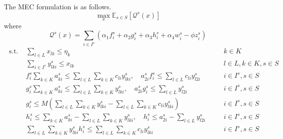 The MEC formulation is as follows.
\begin{equation}
    \max_{x} \mathbb{E}_{s\in S} [ \mathcal{Q}^s(x)]
    \label{eq1}
\end{equation}
where
\begin{equation}
    \mathcal{Q}^s(x) = %
    \sum_{i \in I^s}  (  \alpha_1 f_i^s + \alpha_2 g_i^s + \alpha_3 h_i^s + \alpha_4  w_i^s -\phi z_i^s ) \nonumber
\end{equation}
\begin{align}
\text{ s.t. } & \sum_{l \in L} x_{lk} \leq \eta_k   &\quad&  k \in K
    \label{eq3}\\
   & \sum_{i\in I^s}y_{lki}^s \leq x_{lk}  &&  l \in L,   k \in K,  s \in S 
    \label{eq4}\\
     &    f_i^s\sum_{k \in K}a_{ki}^s   \leq \sum_{l \in L} \sum_{k \in K} c_{li} y_{lki}^s, \quad   a_{2i}^s f_i^s \leq \sum_{l \in L}   c_{li} y_{l2i}^s &&  i \in I^s,   s \in S \label{eq6}\\
     &   g_i^s  \sum_{k \in K}  a_{ki}^s \leq \sum_{l \in L} \sum_{k \in K} y_{lki}^s, \quad   a_{2i}^s g_i^s \leq \sum_{l \in L}   y_{l2i}^s &&   i \in I^s, s \in S \label{eq7}\\
    & g_i^s \leq M \left( \sum_{l \in L} \sum_{k \in K } y_{lki}^s - \sum_{l \in L} \sum_{k \in K} c_{li} y_{lki}^s \right) &&  i \in I^s,   s\in S   \label{eq8}\\
  &  h_i^s \leq   \sum_{k \in K}  a_{ki}^s - \sum_{l \in L} \sum_{k \in K} y_{lki}^s, \quad  h_i^s \leq   a_{2i}^s - \sum_{l \in L}   y_{l2i}^s  && i \in I^s,    s\in S
    \label{eq9}\\
 & \sum_{l \in L} \sum_{k \in K} y_{lki}^s h_i^s \leq \sum_{l \in L} \sum_{k \in K} c_{li} y_{lki}^s && i \in I^s,  s\in S
    \label{eq10}
     \end{align}
